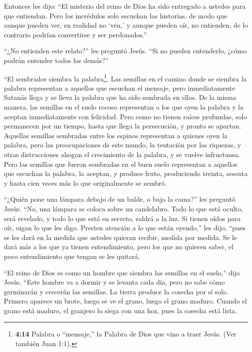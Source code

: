  Entonces les dijo: ``El misterio del reino de Dios ha sido
entregado a ustedes para que entiendan. Pero los incrédulos solo
escuchan las historias,  de modo que aunque pueden ver, en
realidad no `ven,' y aunque pueden oír, no entienden, de lo contrario
podrían convertirse y ser perdonados.''

 ``¿No entienden este relato?'' les preguntó Jesús. ``Si no
pueden entenderlo, ¿cómo podrán entender todos los demás?''

 ``El sembrador siembra la palabra\footnote{\textbf{4:14}
  Palabra o ``mensaje,'' la Palabra de Dios que vino a traer Jesús. (Ver
  también Juan 1:1).}.  Las semillas en el camino donde se
siembra la palabra representan a aquellos que escuchan el mensaje, pero
inmediatamente Satanás llega y se lleva la palabra que ha sido sembrada
en ellos.  De la misma manera, las semillas en el suelo
rocoso representan a los que oyen la palabra y la aceptan inmediatamente
con felicidad.  Pero como no tienen raíces profundas, solo
permanecen por un tiempo, hasta que llega la persecución, y pronto se
apartan.  Aquellas semillas sembradas entre los espinos
representan a quienes oyen la palabra,  pero las
preocupaciones de este mundo, la tentación por las riquezas, y otras
distracciones ahogan el crecimiento de la palabra, y se vuelve
infructuosa.  Pero las semillas que fueron sembradas en el
buen suelo representan a aquellos que escuchan la palabra, la aceptan, y
produce fruto, produciendo treinta, sesenta y hasta cien veces más lo
que originalmente se sembró.

 ``¿Quién pone una lámpara debajo de un balde, o bajo la
cama?'' les preguntó Jesús. ``No, una lámpara se coloca sobre un
candelabro.  Todo lo que está oculto, será revelado, y todo
lo que está en secreto, saldrá a la luz.  Si tienen oídos
para oír, oigan lo que les digo.  Presten atención a lo que
están oyendo,'' les dijo, ``pues se les dará en la medida que ustedes
quieran recibir, medida por medida.  Se le dará más a los
que ya tienen entendimiento, pero los que no quieren saber, el poco
entendimiento que tengan se les quitará.

 ``El reino de Dios es como un hombre que siembra las
semillas en el suelo,'' dijo Jesús.  ``Este hombre va a
dormir y se levanta cada día, pero no sabe cómo germinarán y crecerán
las semillas.  La tierra produce la cosecha por sí sola.
Primero aparece un brote, luego se ve el grano, luego el grano maduro.
 Cuando el grano está maduro, el granjero lo siega con una
hoz, pues la cosecha está lista.

